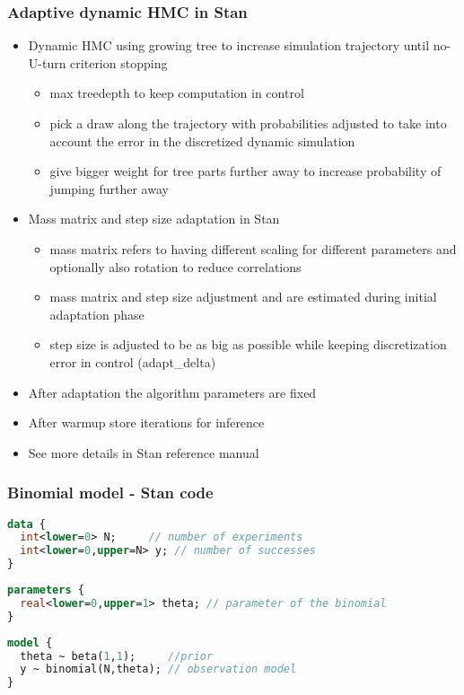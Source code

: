 \documentclass[10pt]{beamer}
\begin{document}
\begin{frame}
\frametitle{Adaptive dynamic HMC in Stan}

  \begin{itemize}
  \item Dynamic HMC using growing tree to increase simulation
    trajectory until no-U-turn criterion stopping %
    \begin{itemize}
    \item max treedepth to keep computation in control
    \item<2-> pick a draw along the trajectory with probabilities adjusted
      to take into account the error in the discretized dynamic
      simulation
    \item<3-> give bigger weight for tree parts further away to increase
      probability of jumping further away
    \end{itemize}
  \item<4-> Mass matrix and step size adaptation in Stan
    \begin{itemize}
    \item<4-> mass matrix refers to having different scaling for different
      parameters and optionally also rotation to reduce correlations
    \item<5-> mass matrix and step size adjustment and are estimated
      during initial adaptation phase
    \item<6-> step size is adjusted to be as big as possible while keeping
      discretization error in control (adapt\_delta)
    \end{itemize}
  \item<7-> After adaptation the algorithm parameters are fixed
  \item<8-> After warmup store iterations for inference
  \item<9-> See more details in Stan reference manual
\end{itemize}

\end{frame}

\begin{frame}[fragile]

\frametitle{Binomial model - Stan code}
  {\small\color{gray}
{
  \begin{lstlisting}[language=Stan,basicstyle=\ttfamily]
data {
  int<lower=0> N;     // number of experiments
  int<lower=0,upper=N> y; // number of successes
}
\end{lstlisting}}
  {
\begin{lstlisting}[language=Stan]
parameters {
  real<lower=0,upper=1> theta; // parameter of the binomial
}
\end{lstlisting}}
{
\begin{lstlisting}[language=Stan]
model {
  theta ~ beta(1,1);     //prior
  y ~ binomial(N,theta); // observation model
}
\end{lstlisting}
}}
\end{frame}
\end{document}
